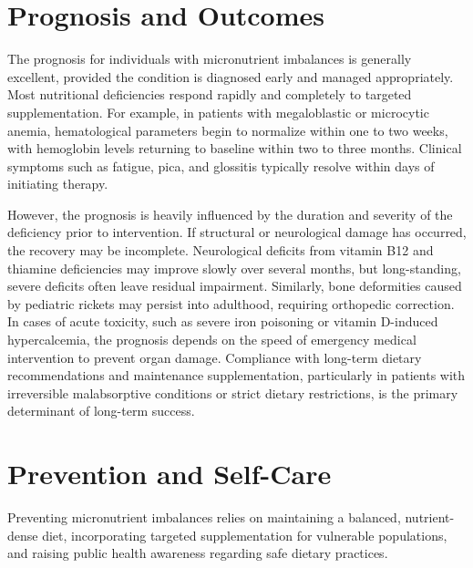\section*{Prognosis and Outcomes}
The prognosis for individuals with micronutrient imbalances is generally excellent, provided the condition is diagnosed early and managed appropriately. Most nutritional deficiencies respond rapidly and completely to targeted supplementation. For example, in patients with megaloblastic or microcytic anemia, hematological parameters begin to normalize within one to two weeks, with hemoglobin levels returning to baseline within two to three months. Clinical symptoms such as fatigue, pica, and glossitis typically resolve within days of initiating therapy.

However, the prognosis is heavily influenced by the duration and severity of the deficiency prior to intervention. If structural or neurological damage has occurred, the recovery may be incomplete. Neurological deficits from vitamin B12 and thiamine deficiencies may improve slowly over several months, but long-standing, severe deficits often leave residual impairment. Similarly, bone deformities caused by pediatric rickets may persist into adulthood, requiring orthopedic correction. In cases of acute toxicity, such as severe iron poisoning or vitamin D-induced hypercalcemia, the prognosis depends on the speed of emergency medical intervention to prevent organ damage. Compliance with long-term dietary recommendations and maintenance supplementation, particularly in patients with irreversible malabsorptive conditions or strict dietary restrictions, is the primary determinant of long-term success.

\section*{Prevention and Self-Care}
Preventing micronutrient imbalances relies on maintaining a balanced, nutrient-dense diet, incorporating targeted supplementation for vulnerable populations, and raising public health awareness regarding safe dietary practices.

